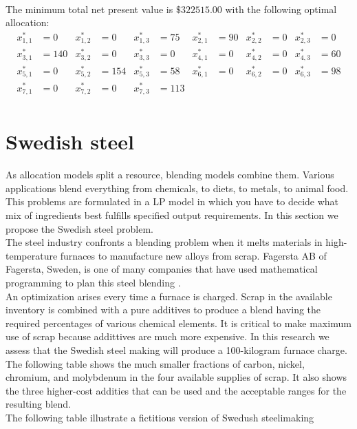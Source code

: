 \documentclass[a4paper,10 pt,titlepage,twoside]{book}
\theoremstyle{plain}
\theoremstyle{definition}
\theoremstyle{remark}
\begin{document}
\\
The minimum total net present value is $\$322515.00$ with the following optimal allocation:
\begin{align*}
x_{1,1}^{*} &=  0 & x_{1,2}^{*}&= 0 & x_{1,3}^{*} &= 75 & x_{2,1}^{*} &= 90 & x_{2,2}^{*} &= 0 & x_{2,3}^{*} &= 0\\
x_{3,1}^{*} &= 140 & x_{3,2}^{*}&= 0 & x_{3,3}^{*} &= 0 & x_{4,1}^{*} &= 0 & x_{4,2}^{*} &= 0 & x_{4,3}^{*} &= 60\\
x_{5,1}^{*} &= 0 & x_{5,2}^{*}&= 154 & x_{5,3}^{*} &= 58 & x_{6,1}^{*} &= 0 & x_{6,2}^{*} &= 0 & x_{6,3}^{*} &= 98\\
 x_{7,1}^{*}&=0 &x_{7,2}^{*} &= 0 & x_{7,3}^{*} &= 113 & & & &  & & \\
\end{align*}
\section{Swedish steel}
As allocation models split a resource, blending models combine them. Various applications blend everything from chemicals, to diets, to metals, to animal food. This problems are formulated in a LP model in which you have to decide what mix of ingredients best fulfills specified output requirements. In this section we propose the Swedish steel problem.\\
The steel industry confronts a blending problem when it melts materials in high-temperature furnaces to manufacture new alloys from scrap. Fagersta AB of Fagersta, Sweden, is one of many companies that have used mathematical programming to plan this steel blending \cite{SSM}.\\
An optimization arises every time a furnace is charged. Scrap in the available inventory is combined with a pure additives to produce a blend having the required percentages of various chemical elements. It is critical to make maximum use of scrap because addittives are much more expensive. In this research we assess that the Swedish steel making will produce a 100-kilogram furnace charge. The following table shows the much smaller fractions of carbon, nickel, chromium, and molybdenum in the four available supplies of scrap. It also shows the three higher-cost addities that can be used and the acceptable ranges for the resulting blend.\\
The following table illustrate a fictitious version of Swedush steelimaking
\end{document}
